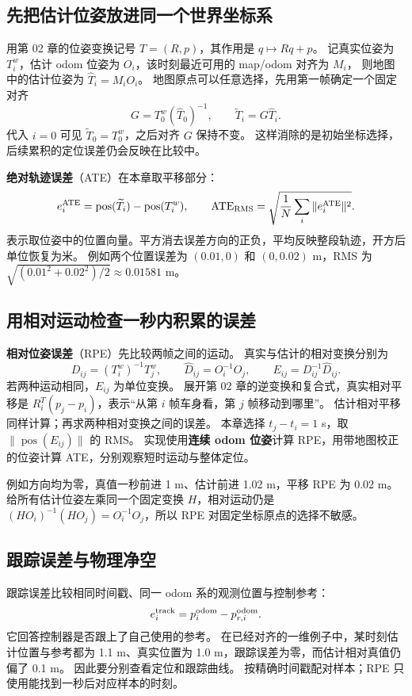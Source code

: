 \subsection{先把估计位姿放进同一个世界坐标系}
用第 02 章的位姿变换记号 $T=(R,p)$，其作用是 $q\mapsto Rq+p$。
记真实位姿为 $T_i^w$，估计 odom 位姿为 $O_i$，该时刻最近可用的 map/odom 对齐为 $M_i$，
则地图中的估计位姿为 $\widehat T_i=M_iO_i$。
地图原点可以任意选择，先用第一帧确定一个固定对齐
\[
 G=T_0^w(\widehat T_0)^{-1},\qquad \widetilde T_i=G\widehat T_i.
\]
代入 $i=0$ 可见 $\widetilde T_0=T_0^w$，之后对齐 $G$ 保持不变。
这样消除的是初始坐标选择，后续累积的定位误差仍会反映在比较中。

\textbf{绝对轨迹误差}（ATE）在本章取平移部分：
\[
 e_i^{\rm ATE}=\operatorname{pos}(\widetilde T_i)-\operatorname{pos}(T_i^w),\qquad
 \mathrm{ATE}_{\rm RMS}=\sqrt{\frac1N\sum_i\|e_i^{\rm ATE}\|^2}.
\]
 表示取位姿中的位置向量。平方消去误差方向的正负，平均反映整段轨迹，开方后单位恢复为米。
例如两个位置误差为 $(0.01,0)$ 和 $(0,0.02)$ m，RMS 为 $\sqrt{(0.01^2+0.02^2)/2}\approx0.01581$ m。

\subsection{用相对运动检查一秒内积累的误差}
\textbf{相对位姿误差}（RPE）先比较两帧之间的运动。
真实与估计的相对变换分别为
\[
 D_{ij}=(T_i^w)^{-1}T_j^w,\qquad\widehat D_{ij}=O_i^{-1}O_j,\qquad
 E_{ij}=D_{ij}^{-1}\widehat D_{ij}.
\]
若两种运动相同，$E_{ij}$ 为单位变换。
展开第 02 章的逆变换和复合式，真实相对平移是
$R_i^T(p_j-p_i)$，表示“从第 $i$ 帧车身看，第 $j$ 帧移动到哪里”。
估计相对平移同样计算；再求两种相对变换之间的误差。
本章选择 $t_j-t_i=1$ s，取 $\|\operatorname{pos}(E_{ij})\|$ 的 RMS。
实现使用\textbf{连续 odom 位姿}计算 RPE，用带地图校正的位姿计算 ATE，分别观察短时运动与整体定位。

例如方向均为零，真值一秒前进 1 m、估计前进 1.02 m，平移 RPE 为 0.02 m。
给所有估计位姿左乘同一个固定变换 $H$，相对运动仍是
$(HO_i)^{-1}(HO_j)=O_i^{-1}O_j$，所以 RPE 对固定坐标原点的选择不敏感。

\subsection{跟踪误差与物理净空}
跟踪误差比较相同时间戳、同一 odom 系的观测位置与控制参考：
\[
 e_i^{\rm track}=p_i^{\rm odom}-p_{r,i}^{\rm odom}.
\]
它回答控制器是否跟上了自己使用的参考。
在已经对齐的一维例子中，某时刻估计位置与参考都为 1.1 m、真实位置为 1.0 m，跟踪误差为零，而估计相对真值仍偏了 0.1 m。
因此要分别查看定位和跟踪曲线。
 按精确时间戳配对样本；RPE 只使用能找到一秒后对应样本的时刻。

